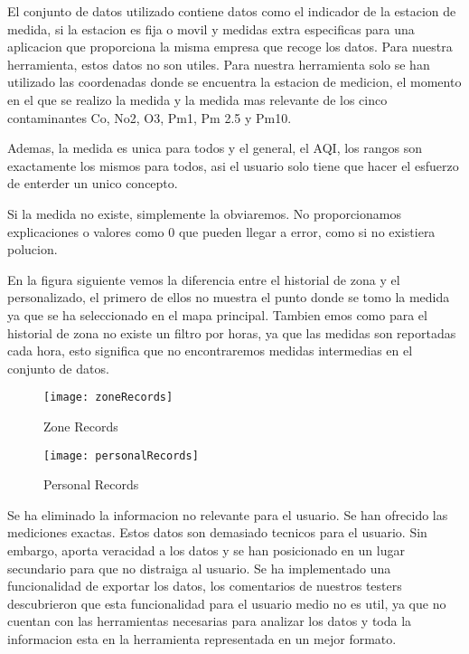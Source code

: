 El conjunto de datos utilizado contiene datos como el indicador de la estacion de medida, si la estacion es fija o movil
y medidas extra especificas para una aplicacion que proporciona la misma empresa que recoge los datos. Para nuestra
herramienta, estos datos no son utiles.
Para nuestra herramienta solo se han utilizado las coordenadas donde se encuentra la estacion de medicion, el momento en 
el que se realizo la medida y la medida mas relevante de los cinco contaminantes Co, No2, O3, Pm1, Pm 2.5 y Pm10.

Ademas, la medida es unica para todos y el general, el AQI, los rangos son exactamente los mismos para todos, asi el usuario
solo tiene que hacer el esfuerzo de enterder un unico concepto. 

Si la medida no existe, simplemente la obviaremos. No proporcionamos explicaciones o valores como 0 que pueden llegar a 
error, como si no existiera polucion.


En la figura siguiente vemos la diferencia entre el historial de zona y el personalizado, el primero de ellos no muestra
el punto donde se tomo la medida ya que se ha seleccionado en el mapa principal. Tambien emos como para el historial de 
zona no existe un filtro por horas, ya que las medidas son reportadas cada hora, esto significa que no encontraremos 
medidas intermedias en el conjunto de datos.
 
\begin{figure}[ht]
    \centering
    \texttt{[image: zoneRecords]}
    \caption{Zone Records}
\end{figure}
\begin{figure}[ht]
    \centering
    \texttt{[image: personalRecords]}
    \caption{Personal Records}
\end{figure}


\begin{itemize}
    \done Se ha eliminado la informacion no relevante para el usuario.
    \crossed Se han ofrecido las mediciones exactas. Estos datos son demasiado tecnicos para el usuario. Sin embargo,
    aporta veracidad a los datos y se han  posicionado en un lugar secundario para que no distraiga al usuario.
    \crossed Se ha implementado una funcionalidad de exportar los datos, los comentarios de nuestros testers descubrieron
    que esta funcionalidad para el usuario medio no es util, ya que no cuentan con las herramientas necesarias para
    analizar los datos y toda la informacion esta en la herramienta representada en un mejor formato.
    
\end{itemize}
 \newpage